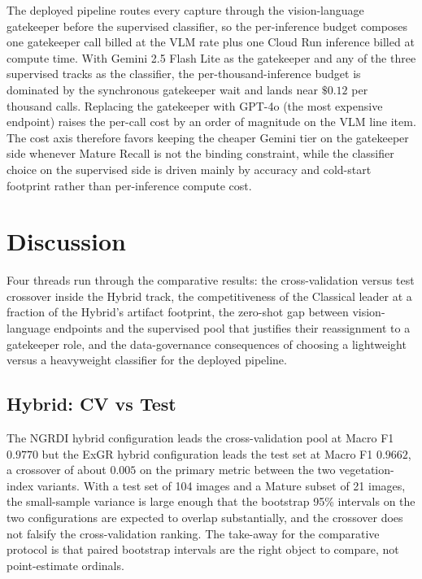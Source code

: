 The deployed pipeline routes every capture through the vision-language gatekeeper before the supervised classifier, so the per-inference budget composes one gatekeeper call billed at the VLM rate plus one Cloud Run inference billed at compute time. With Gemini 2.5 Flash Lite as the gatekeeper and any of the three supervised tracks as the classifier, the per-thousand-inference budget is dominated by the synchronous gatekeeper wait and lands near $\$0.12$ per thousand calls. Replacing the gatekeeper with GPT-4o (the most expensive endpoint) raises the per-call cost by an order of magnitude on the VLM line item. The cost axis therefore favors keeping the cheaper Gemini tier on the gatekeeper side whenever Mature Recall is not the binding constraint, while the classifier choice on the supervised side is driven mainly by accuracy and cold-start footprint rather than per-inference compute cost.


\section{Discussion}

Four threads run through the comparative results: the cross-validation versus test crossover inside the Hybrid track, the competitiveness of the Classical leader at a fraction of the Hybrid's artifact footprint, the zero-shot gap between vision-language endpoints and the supervised pool that justifies their reassignment to a gatekeeper role, and the data-governance consequences of choosing a lightweight versus a heavyweight classifier for the deployed pipeline.

\subsection{Hybrid: CV vs Test}

The NGRDI hybrid configuration leads the cross-validation pool at Macro F1 $0.9770$ but the ExGR hybrid configuration leads the test set at Macro F1 $0.9662$, a crossover of about $0.005$ on the primary metric between the two vegetation-index variants. With a test set of 104 images and a Mature subset of 21 images, the small-sample variance is large enough that the bootstrap 95\% intervals on the two configurations are expected to overlap substantially, and the crossover does not falsify the cross-validation ranking. The take-away for the comparative protocol is that paired bootstrap intervals are the right object to compare, not point-estimate ordinals.

